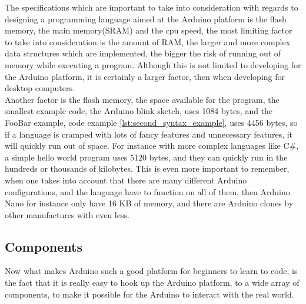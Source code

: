 The specifications which are important to take into consideration with regards to designing a programming language aimed at the Arduino platform is the flash memory, the main memory(SRAM) and the cpu speed, the most limiting factor to take into consideration is the amount of RAM, the larger and more complex data structures which are implemented, the bigger the risk of running out of memory while executing a program. Although this is not limited to developing for the Arduino platform, it is certainly a larger factor, then when developing for desktop computers.\\

Another factor is the flash memory, the space available for the program, the smallest example code, the Arduino blink sketch, uses 1084 bytes, and the FooBar example, code example \ref{lst:second_syntax_example}, uses 4456 bytes, so if a language is cramped with lots of fancy features and unnecessary features, it will quickly run out of space. For instance with more complex languages like C\#, a simple hello world program uses 5120 bytes, and they can quickly run in the hundreds or thousands of kilobytes. This is even more important to remember, when one takes into account that there are many different Arduino configurations, and the language have to function on all of them, then Arduino Nano for instance only have 16 KB of memory, and there are Arduino clones by other manufactures with even less.  

\subsection*{Components}
Now what makes Arduino such a good platform for beginners to learn to code, is the fact that it is really easy to hook up the Arduino platform, to a wide array of components, to make it possible for the Arduino to interact with the real world.


